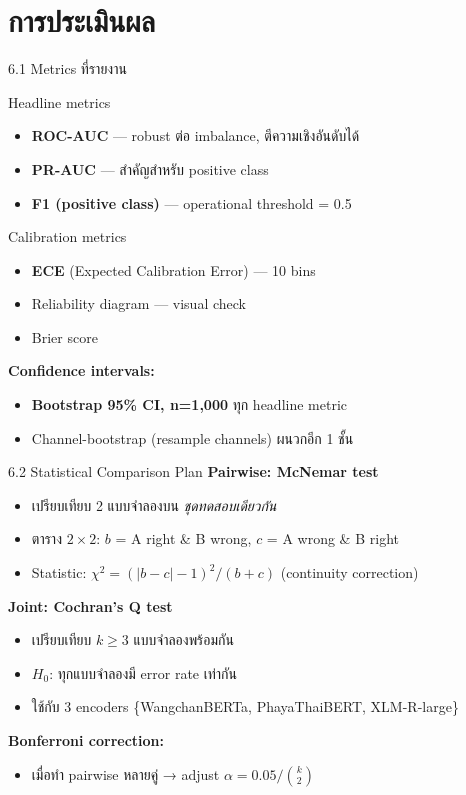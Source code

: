\documentclass[aspectratio=169,11pt,xcolor=dvipsnames]{beamer}
\newcommand{\hl}[1]{\textcolor{kmitlOrange}{\textbf{#1}}}
\newcommand{\hlb}[1]{\textcolor{kmitlBlue}{\textbf{#1}}}
\begin{document}
\section{การประเมินผล}

\begin{frame}{6.1 Metrics ที่รายงาน}
  \begin{block}{Headline metrics}
    \begin{itemize}
      \item \hlb{ROC-AUC} — robust ต่อ imbalance, ตีความเชิงอันดับได้
      \item \hlb{PR-AUC} — สำคัญสำหรับ positive class
      \item \hlb{F1 (positive class)} — operational threshold = 0.5
    \end{itemize}
  \end{block}
  \begin{block}{Calibration metrics}
    \begin{itemize}
      \item \hlb{ECE} (Expected Calibration Error) — 10 bins
      \item Reliability diagram — visual check
      \item Brier score
    \end{itemize}
  \end{block}
  \textbf{Confidence intervals:}
  \begin{itemize}
    \item \hl{Bootstrap 95\% CI, n=1{,}000} ทุก headline metric
    \item Channel-bootstrap (resample channels) ผนวกอีก 1 ชั้น
  \end{itemize}
\end{frame}

\begin{frame}{6.2 Statistical Comparison Plan}
  \textbf{Pairwise: McNemar test}
  \begin{itemize}
    \item เปรียบเทียบ 2 แบบจำลองบน \emph{ชุดทดสอบเดียวกัน}
    \item ตาราง $2\times 2$: $b$ = A right \& B wrong, $c$ = A wrong \& B right
    \item Statistic: $\chi^2 = (|b-c|-1)^2 / (b+c)$ (continuity correction)
  \end{itemize}
  \vspace{0.4em}
  \textbf{Joint: Cochran's Q test}
  \begin{itemize}
    \item เปรียบเทียบ $k \geq 3$ แบบจำลองพร้อมกัน
    \item $H_0$: ทุกแบบจำลองมี error rate เท่ากัน
    \item ใช้กับ 3 encoders \{WangchanBERTa, PhayaThaiBERT, XLM-R-large\}
  \end{itemize}
  \vspace{0.4em}
  \textbf{Bonferroni correction:}
  \begin{itemize}
    \item เมื่อทำ pairwise หลายคู่ → adjust $\alpha = 0.05 / \binom{k}{2}$
  \end{itemize}
\end{frame}
\end{document}

